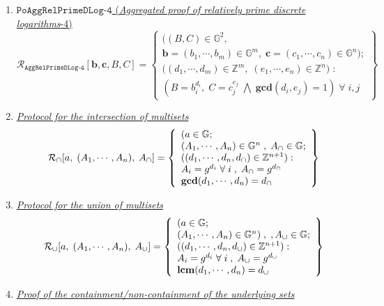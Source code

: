 \documentclass[11pt, lettersize, notitlepage, leqno, footskip=0.6cm]{article}
\newcommand{\bz}{\mathbb Z}
\newcommand{\ttt}{\texttt}
\newcommand{\bG}{\mathbb{G}}
\newcommand{\mc}{\mathcal}
\newcommand{\mb}{\mathbb}
\newcommand{\mbf}{\mathbf}
\newcommand{\vs}{\vspace{-0.15cm}}
\newcommand{\LCM}{\mbf{lcm}}
\newcommand{\GCD}{\mbf{gcd}}
\numberwithin{equation}{section}
\begin{document}
{{\begin{enumerate}[wide, labelwidth=!, labelindent=0pt]
\item \hyperlink{RP4}{$\ttt{PoAggRelPrimeDLog-4}$ (\textit{Aggregated proof of relatively prime discrete logarithms}-4)} \vs \[
  \mc{R}_{{\ttt{AggRelPrimeDLog-4}}}[\mbf{b}, \mbf{c}, B, C] = \left\{\begin{array}{l}
    \big((B,C)\in\mb{G}^2,\;\\
     \mbf{b} = (b_1,\cdots,b_m)\in\mb{G}^m,\;\mbf{c} = (c_1,\cdots, c_n)\in\mb{G}^n);\\
    ((d_1,\cdots,d_m)\in\bz^m,\; (e_1,\cdots,e_n)\in\bz^n\big)\;: \\
    (B = b_i^{d_i},\; C = c_j^{e_j}\;\bigwedge \; \GCD(d_i, e_j) = 1)\;\forall \;i,j
  \end{array}\right\}
\]   

\item \hyperlink{Int}{\textit{Protocol for the intersection of multisets}} \vs \[
  \mc{R}_{\tt{\cap}}[a,\; (A_1,\cdots,A_n),\; A_{\tt{\cap}}] = \left\{\begin{array}{l}
    (a\in\mb{G};\;\\
     (A_1,\cdots,A_n)\in\mb{G}^{n}\;,\; A_{\tt{\cap}}\in\bG;\\
    ((d_1,\cdots,d_n, d_{\tt{\cap}})\in\bz^{n+1}): \\
    A_i = g^{d_i}\;\forall\;i\;,\; A_{\tt{\cap}} = g^{d_{\tt{\cap}}}   \\
    
  \GCD(d_1, \cdots, d_n) = d_{\tt{\cap}}
  \end{array}\right\}
\] 

\item \hyperlink{Uni}{\textit{Protocol for the union of multisets }}\vs \[
  \mc{R}_{\tt{\cup}}[a,\; (A_1,\cdots,A_n),\; A_{\tt{\cup}}] = \left\{\begin{array}{l}
    (a\in\mb{G};\;\\
     (A_1,\cdots,A_n)\in \mb{G}^{n})\;,\;,A_{\tt{\cup}}\in\mb{G};\\
    ((d_1,\cdots,d_n, d_{\tt{\cup}})\in\bz^{n+1}): \\
    A_i = g^{d_i}\;\forall\;i\;,\; A_{\tt{\cup}} = g^{d_{\tt{\cup}}}   \\
    
  \LCM(d_1, \cdots, d_n) = d_{\tt{\cup}}
  \end{array}\right\}
\] 

\item \hyperlink{Sets}{\textit{Proof of the containment/non-containment of the underlying sets}}\vspace{-0.4cm}


\end{enumerate}}}
\end{document}
